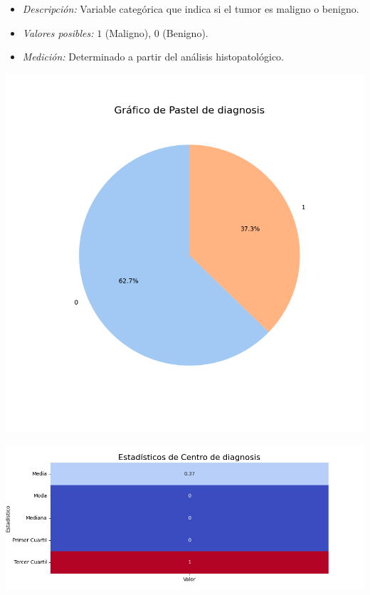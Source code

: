 \documentclass[a4paper, 12pt]{article}
\begin{document}
 \begin{itemize}
	\item \textit{Descripción:} Variable categórica que indica si el tumor es maligno o benigno.
	\item \textit{Valores posibles:}
	$1$ (Maligno), $0$ (Benigno).
	\item \textit{Medición:} Determinado a partir del análisis histopatológico.
\end{itemize}

	\includegraphics[width=\textwidth]{../Plots/plots_stats/diagnosis/grafico_pastel_diagnosis.png}



	
	\includegraphics[width=\textwidth]{../Plots/plots_stats/diagnosis/estadisticas_centro_diagnosis.png}
\end{document}
